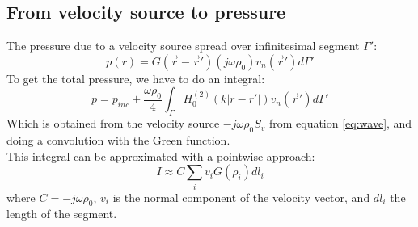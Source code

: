 \documentclass[12pt, openany]{report}
\theoremstyle{definition}
\begin{document}
\subsection{From velocity source to pressure}
The pressure due to a velocity source spread over infinitesimal segment $\Gamma'$:
\begin{equation}
  p(r) = G(\vec r-\vec r') (j\omega \rho_0) v_n(\vec r')d\Gamma'
\end{equation}
To get the total pressure, we have to do an integral:
\begin{equation}
  p = p_{inc} + \frac{\omega \rho_0}{4} \int_\Gamma H_0^{(2)}(k|r-r'|)v_n(\vec r')d\Gamma'  
\end{equation}
Which is obtained from the velocity source $-j\omega \rho_0S_v$ from equation \eqref{eq:wave}, and doing a convolution with the Green function. \\

This integral can be approximated with a pointwise approach:
\begin{equation}
  I\approx C\sum_i v_iG(\rho_i)dl_i
\end{equation}
where $C=-j\omega\rho_0$, $v_i$ is the normal component of the velocity vector, and $dl_i$ the length of the segment.  
\end{document}
